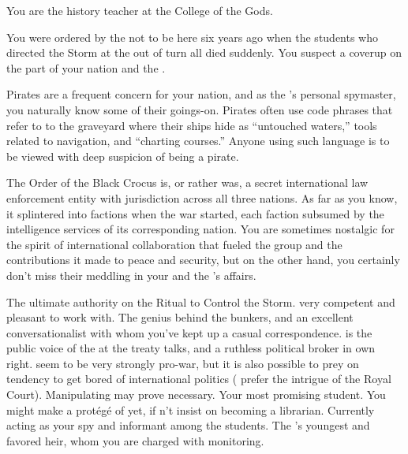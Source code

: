 \documentclass[char]{GL2020}
\begin{document}
\begin{itemz}[Notes]
	\item You are the history teacher at the College of the Gods.
	\item You were ordered by the \cQueen{\Majesty} not to be here six years ago when the students who directed the Storm at the \pShippies{} out of turn all died suddenly. You suspect a coverup on the part of your nation and the \pTech{}.
	\item Pirates are a frequent concern for your nation, and as the \cQueen{\Majesty}'s personal spymaster, you naturally know some of their goings-on. Pirates often use code phrases that refer to to the graveyard where their ships hide as ``untouched waters,'' tools related to navigation, and ``charting courses.'' Anyone using such language is to be viewed with deep suspicion of being a pirate.
	\item The Order of the Black Crocus is, or rather was, a secret international law enforcement entity with jurisdiction across all three nations. As far as you know, it splintered into factions when the war started, each faction subsumed by the intelligence services of its corresponding nation. You are sometimes nostalgic for the spirit of international collaboration that fueled the group and the contributions it made to peace and security, but on the other hand, you certainly don't miss their meddling in your and the \cQueen{\Majesty}'s affairs.
\end{itemz}

\begin{contacts}
	\contact{\cLibrarian{}} The ultimate authority on the Ritual to Control the Storm. \cLibrarian{\Theyare} very competent and pleasant to work with.
	\contact{\cBunker{}} The genius behind the bunkers, and an excellent conversationalist with whom you've kept up a casual correspondence.
	\contact{\cEvil{}} \cEvil{} is the public voice of the \cQueen{\Majesty} at the treaty talks, and a ruthless political broker in \cEvil{\their} own right. \cEvil{\They} seem to be very strongly pro-war, but it is also possible to prey on \cEvil{\their} tendency to get bored of international politics (\cEvil{\They} prefer the intrigue of the Royal Court). Manipulating \cEvil{\them} may prove necessary.
	\contact{\cLibAssist{}} Your most promising student. You might make a protégé of \cLibAssist{\them} yet, if \cLibAssist{\they} \cLibAssist{\does}n't insist on becoming a librarian. Currently acting as your spy and informant among the students.
	\contact{\cPrince{}} The \cQueen{\Majesty}'s youngest \cPrince{\child} and favored heir, whom you are charged with monitoring.
\end{contacts}
\end{document}
